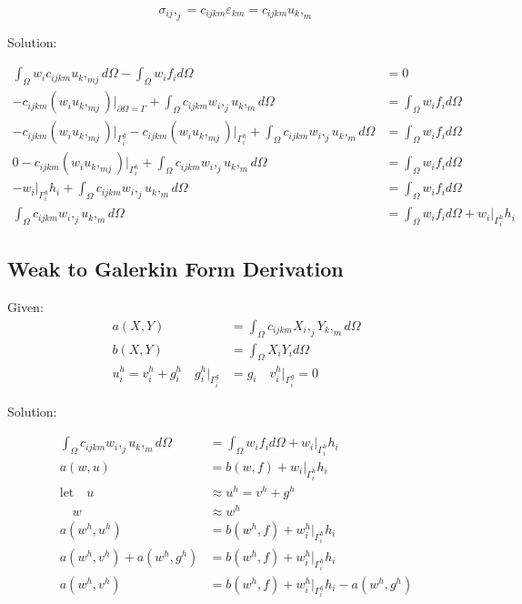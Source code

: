 \documentclass[a4paper, 12pt]{article}
\begin{document}
\begin{equation*}
\sigma_{ij},_{j} = c_{ijkm} \varepsilon_{km} = c_{ijkm} u_{k},_{m}
\end{equation*}

\noindent
Solution:

\begin{align*}
\int_{\Omega} w_{i} c_{ijkm} u_{k},_{mj} d\Omega - 
  \int_{\Omega} w_{i} f_{i} d\Omega &= 0 \\
-c_{ijkm}(w_{i} u_{k},_{mj})\Big|_{\partial\Omega = \Gamma} 
  + \int_{\Omega} c_{ijkm} w_{i},_{j} u_{k},_{m} d\Omega
  &=\int_{\Omega} w_{i} f_{i} d\Omega  \\
-c_{ijkm}(w_{i} u_{k},_{mj})\Big|_{\Gamma^{g}_{i}} 
-c_{ijkm}(w_{i} u_{k},_{mj})\Big|_{\Gamma^{h}_{i}} 
  + \int_{\Omega} c_{ijkm} w_{i},_{j} u_{k},_{m} d\Omega
  &=\int_{\Omega} w_{i} f_{i} d\Omega \\
0
 -c_{ijkm}(w_{i} u_{k},_{mj})\Big|_{\Gamma^{h}_{i}} 
  + \int_{\Omega} c_{ijkm} w_{i},_{j} u_{k},_{m} d\Omega
  &=\int_{\Omega} w_{i} f_{i} d\Omega \\
-w_{i}\Big|_{\Gamma^{h}_{i}} h_{i}
  + \int_{\Omega} c_{ijkm} w_{i},_{j} u_{k},_{m} d\Omega
  &=\int_{\Omega} w_{i} f_{i} d\Omega \\
\int_{\Omega} c_{ijkm} w_{i},_{j} u_{k},_{m} d\Omega &=
  \int_{\Omega} w_{i} f_{i} d\Omega +
  w_{i}\Big|_{\Gamma^{h}_{i}} h_{i}
\end{align*}

\newpage
\subsection{Weak to Galerkin Form Derivation} \label{sec:GalerkinDer}

Given:
\begin{align*}
a( X, Y ) &= 
  \int_{\Omega} c_{ijkm} X_{i},_{j} Y_{k},_{m} d\Omega \\
b( X, Y ) &= 
  \int_{\Omega} X_{i} Y_{i} d\Omega \\
u^{h}_{i} = 
  v^{h}_{i} + g^{h}_{i} 
  \quad
  g^{h}_{i}\Big|_{\Gamma^{g}_{i}} &= g_{i} 
  \quad 
  v^{h}_{i}\Big|_{\Gamma^{g}_{i}} = 0
\end{align*}

\noindent
Solution:

\begin{align*}
\int_{\Omega} c_{ijkm} w_{i},_{j} u_{k},_{m} d\Omega 
 &= \int_{\Omega} w_{i} f_{i} d\Omega
  + w_{i}\Big|_{\Gamma^{h}_{i}} h_{i} \\
a(w, u)
 &= b(w , f) 
  + w_{i}\Big|_{\Gamma^{h}_{i}} h_{i}  \\
\text{let} \quad u &\approx u^{h} = v^{h} + g^{h} \\
 \quad w &\approx w^{h} \\
a(w^{h} , u^{h} ) 
 &= b(w^{h}, f) 
  + w^{h}_{i}\Big|_{\Gamma^{h}_{i}} h_{i}  \\
a(w^{h} , v^{h} ) 
  + a(w^{h} , g^{h} ) 
 &= b(w^{h}, f) 
  + w^{h}_{i}\Big|_{\Gamma^{h}_{i}} h_{i}  \\
a(w^{h} , v^{h})
 &= b(w^{h} , f) 
  + w^{h}_{i}\Big|_{\Gamma^{h}_{i}} h_{i} 
  - a(w^{h} , g^{h})
\end{align*}
\end{document}
